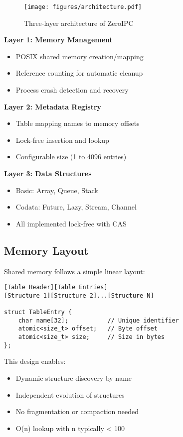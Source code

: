 \documentclass[letterpaper,twocolumn,10pt]{article}
\newcommand{\projectname}{ZeroIPC}
\begin{document}
\begin{figure}[h]
\centering
\texttt{[image: figures/architecture.pdf]}
\caption{Three-layer architecture of \projectname{}}
\label{fig:architecture}
\end{figure}

\textbf{Layer 1: Memory Management}
\begin{itemize}
\item POSIX shared memory creation/mapping
\item Reference counting for automatic cleanup
\item Process crash detection and recovery
\end{itemize}

\textbf{Layer 2: Metadata Registry}
\begin{itemize}
\item Table mapping names to memory offsets
\item Lock-free insertion and lookup
\item Configurable size (1 to 4096 entries)
\end{itemize}

\textbf{Layer 3: Data Structures}
\begin{itemize}
\item Basic: Array, Queue, Stack
\item Codata: Future, Lazy, Stream, Channel
\item All implemented lock-free with CAS
\end{itemize}

\subsection{Memory Layout}

Shared memory follows a simple linear layout:

\begin{lstlisting}[caption={Memory Layout Structure}]
[Table Header][Table Entries]
[Structure 1][Structure 2]...[Structure N]

struct TableEntry {
    char name[32];           // Unique identifier
    atomic<size_t> offset;   // Byte offset
    atomic<size_t> size;     // Size in bytes
};
\end{lstlisting}

This design enables:
\begin{itemize}
\item Dynamic structure discovery by name
\item Independent evolution of structures
\item No fragmentation or compaction needed
\item O(n) lookup with n typically < 100
\end{itemize}
\end{document}

